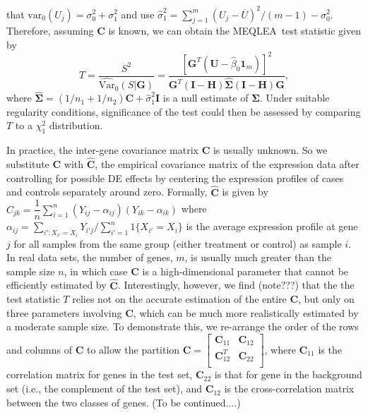 \documentclass[a4,center,fleqn]{NAR}
\newcommand{\OurMethod}{MEQLEA}
\begin{document}
	that $\mbox{var}_{0}(U_j)=\sigma_0^2+\sigma_1^2$ and use
	$\hat\sigma_1^2=\sum_{j=1}^m(U_j-\overline{U})^2/(m-1)-\sigma_0^2$. Therefore, assuming $\bm C$ is
	known, we can obtain the \OurMethod~test statistic given by
	\begin{equation}
	T = \dfrac{S^2}{\widehat{\mbox{Var}}_{0}(S|\bm G)} = \dfrac{[\bm G^T(\bm U-\hat\beta_0\bm
		1_m)]^2}{\bm G^T(\bm I-\bm H)\hat{\bm\Sigma}(\bm I-\bm H)\bm G}, 
	\end{equation}
	where $\hat{\bm\Sigma}=(1/n_1+1/n_2)\bm C+\hat\sigma_1^2\bm I$ is a null estimate of $\bm \Sigma$.
	Under suitable regularity conditions, significance of the test could then be assessed by comparing
	$T$ to a $\chi^2_1$ distribution.
	
	In practice, the inter-gene covariance matrix $\bm C$ is usually unknown. So we substitute $\bm C$
	with $\hat {\bm C}$, the empirical covariance matrix of the expression data after controlling for
	possible DE effects by centering the expression profiles of cases and controls separately around
	zero. Formally, $\hat {\bm C}$ is given by $\hat
	C_{jk}=\dfrac{1}{n}\sum_{i=1}^n(Y_{ij}-\alpha_{ij})(Y_{ik}-\alpha_{ik})$ where
	$\alpha_{ij}=\sum_{i':X_{i'}=X_{i}}Y_{i'j}/\sum_{i'=1}^n1\{X_{i'}=X_{i}\}$ is the average expression
	profile at gene $j$ for all samples from the same group (either treatment or control) as sample $i$.
	In real data sets, the number of genes, $m$, is usually much greater than the sample size $n$, in
	which case $\bm C$ is a high-dimensional parameter that cannot be efficiently estimated by $\hat
	{\bm C}$. Interestingly, however, we find (note???) that the the test statistic $T$ relies not on
	the accurate estimation of the entire $\bm C$, but only on three parameters involving $\bm C$, which
	can be much more realistically estimated by a moderate sample size. To demonstrate this, we
	re-arrange the order of the rows and columns of $\bm C$ to allow the partition $\bm
	C=\left[\begin{array}{cc}
	\bm C_{11} & \bm C_{12} \\       \bm C_{12}^T & \bm C_{22} \\      \end{array}\right] $,
	where $\bm C_{11}$ is the correlation matrix for genes in the test set, $\bm C_{22}$ is that for
	gene in the background set (i.e., the complement of the test set), and $\bm C_{12}$ is the
	cross-correlation matrix between the two classes of genes. (To be continued....)
	
	
	
\end{document}
